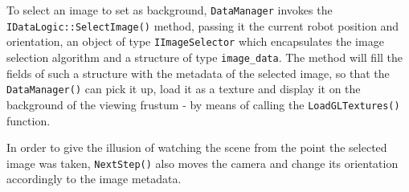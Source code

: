 %
To select an image to set as background, \texttt{DataManager} 
invokes the \\
\texttt{IDataLogic::SelectImage()} method, 
passing it the current robot position and orientation, 
an object of type \texttt{IImageSelector} which 
encapsulates the image selection algorithm and a structure 
of type \texttt{image\_data}.
%
The method will fill the fields of such a structure with 
the metadata of the selected image, so that the 
\texttt{DataManager()} can pick it up, load it as a 
texture and display it on the background of the 
viewing frustum - by means of calling the 
\texttt{LoadGLTextures()} function.
%

%
In order to give the illusion of watching the scene 
from the point the selected image was taken, 
\texttt{NextStep()} also moves the camera and change 
its orientation accordingly to the image metadata.
%
%



